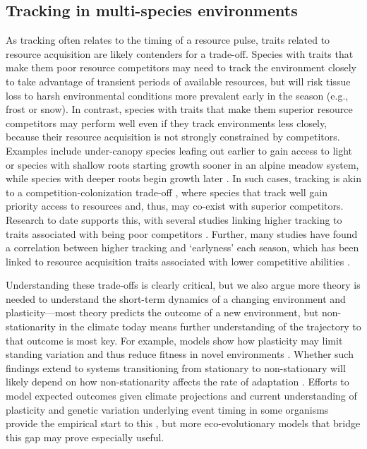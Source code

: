 \documentclass[11pt,letterpaper]{article}
\begin{document}
\subsection{Tracking in multi-species environments}

As tracking often relates to the timing of a resource pulse, traits related to resource acquisition are likely contenders for a trade-off. Species with traits that make them poor resource competitors may need to track the environment closely to take advantage of transient periods of available resources, but will risk tissue loss to harsh environmental conditions more prevalent early in the season (e.g., frost or snow). In contrast, species with traits that make them superior resource competitors may perform well even if they track environments less closely, because their resource acquisition is not strongly constrained by competitors. Examples include under-canopy species leafing out earlier to gain access to light \citep{heberling2019} or species with shallow roots starting growth sooner in an alpine meadow system, while species with deeper roots begin growth later \citep{Zhu2016BioLetters}. In such cases, tracking is akin to a competition-colonization trade-off \citep{Amarasekare:2003tq}, where species that track well gain priority access to resources and, thus, may co-exist with superior competitors. Research to date supports this, with several studies linking higher tracking to traits associated with being poor competitors \citep{Dorji2013,lasky2016,Zhu2016BioLetters}. Further, many studies have found a correlation between higher tracking and `earlyness' each season, which has been linked to resource acquisition traits associated with lower competitive abilities \citep[][see Box `Trait trade-offs with tracking']{wolkovich2014aob}. 

Understanding these trade-offs is clearly critical, but we also argue more theory is needed to understand the short-term dynamics of a changing environment and plasticity---most theory predicts the outcome of a new environment, but non-stationarity in the climate today means further understanding of the trajectory to that outcome is most key. For example, models show how plasticity may limit standing variation and thus reduce fitness in novel environments \citep{Ghalambor2007,fox2019}. Whether such findings extend to systems transitioning from stationary to non-stationary will likely depend on how non-stationarity affects the rate of adaptation \citep{chevin2010}. Efforts to model expected outcomes given climate projections and current understanding of plasticity and genetic variation underlying event timing in some organisms provide the empirical start to this \citep[e.g.,][]{fournier2016}, but more eco-evolutionary models that bridge this gap may prove especially useful. 
\end{document}
